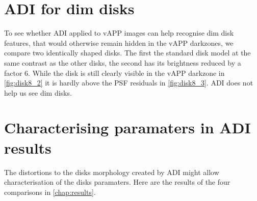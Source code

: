 \section{ADI for dim disks}
To see whether \ac{ADI} applied to \ac{vAPP} images can help recognise dim disk features, that would otherwise remain hidden in the \ac{vAPP} darkzones, we compare two identically shaped disks. The first the standard disk model at the same contrast as the other disks, the second has its brightness reduced by a factor 6. While the disk is still clearly visible in the \ac{vAPP} darkzone in \autoref{fig:disk8_2} it is hardly above the \ac{PSF} residuals in \autoref{fig:disk8_3}. \ac{ADI} does not help us see dim disks.

\section{Characterising paramaters in ADI results}
The distortions to the disks morphology created by \ac{ADI} might allow characterisation of the disks paramaters. Here are the results of the four comparisons in \autoref{chap:results}.

